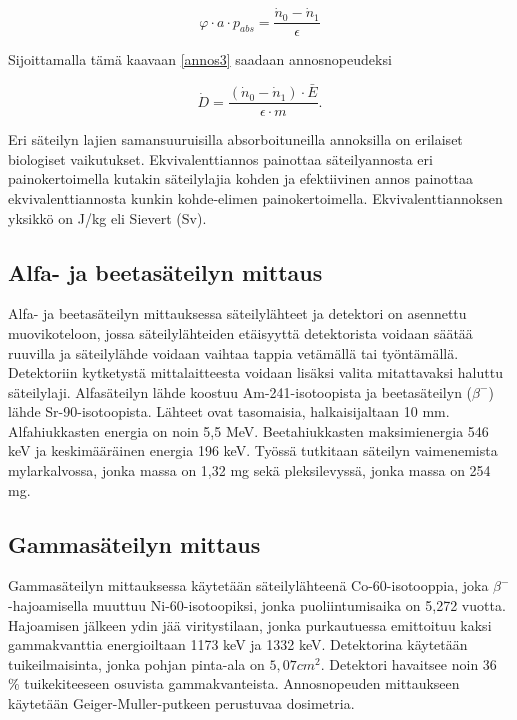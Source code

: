 \documentclass[a4paper,11pt]{article}
\begin{document}
\begin{equation}
  \varphi \cdot a \cdot p_{abs} = \frac{\dot{n}_0-\dot{n}_1}{\epsilon}
\end{equation}

Sijoittamalla tämä kaavaan \ref{annos3} saadaan annosnopeudeksi

\begin{equation}
  \label{annosnopeus}
  \dot{D} = \frac{(\dot{n}_0-\dot{n}_1) \cdot \bar{E}}{\epsilon \cdot m} .
\end{equation}

Eri säteilyn lajien samansuuruisilla absorboituneilla annoksilla on erilaiset biologiset vaikutukset. Ekvivalenttiannos painottaa säteilyannosta eri painokertoimella kutakin säteilylajia kohden ja efektiivinen annos painottaa ekvivalenttiannosta kunkin kohde-elimen painokertoimella. Ekvivalenttiannoksen yksikkö on J/kg eli Sievert (Sv).

\cite{ohje}

\subsection{Alfa- ja beetasäteilyn mittaus}
\label{laitteisto:alfabeeta}

Alfa- ja beetasäteilyn mittauksessa säteilylähteet ja detektori on asennettu muovikoteloon, jossa säteilylähteiden etäisyyttä detektorista voidaan säätää ruuvilla ja säteilylähde voidaan vaihtaa tappia vetämällä tai työntämällä. Detektoriin kytketystä mittalaitteesta voidaan lisäksi valita mitattavaksi haluttu säteilylaji. Alfasäteilyn lähde koostuu Am-241-isotoopista ja beetasäteilyn ($\beta^-$) lähde Sr-90-isotoopista. Lähteet ovat tasomaisia, halkaisijaltaan 10 mm. Alfahiukkasten energia on noin 5,5 MeV. Beetahiukkasten maksimienergia 546 keV ja keskimääräinen energia 196 keV. Työssä tutkitaan säteilyn vaimenemista mylarkalvossa, jonka massa on 1,32 mg sekä pleksilevyssä, jonka massa on 254 mg. \cite{ohje}


\subsection{Gammasäteilyn mittaus}
\label{laitteisto:gamma}

Gammasäteilyn mittauksessa käytetään säteilylähteenä Co-60-isotooppia, joka $\beta^-$-hajoamisella muuttuu Ni-60-isotoopiksi, jonka puoliintumisaika on 5,272 vuotta. Hajoamisen jälkeen ydin jää viritystilaan, jonka purkautuessa emittoituu kaksi gammakvanttia energioiltaan 1173 keV ja 1332 keV. Detektorina käytetään tuikeilmaisinta, jonka pohjan pinta-ala on $5,07 cm^2$. Detektori havaitsee noin 36 \% tuikekiteeseen osuvista gammakvanteista. Annosnopeuden mittaukseen käytetään Geiger-Muller-putkeen perustuvaa dosimetria. \cite{ohje}
\end{document}

